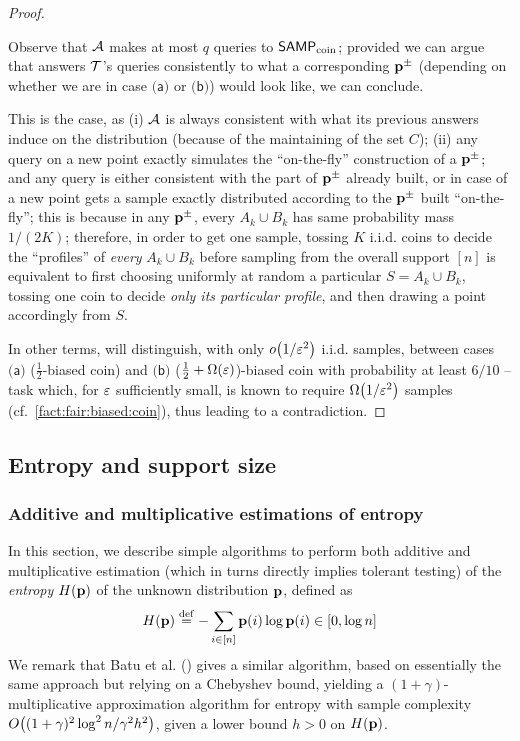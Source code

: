\begin{proof}
\begin{itemize}
\begin{itemize}
    \end{itemize}
  \end{itemize}
  Observe that $\mathcal{A}$ makes at most $q$ queries to ${\sf SAMP}_\text{coin}$; provided we can argue that \Algo answers $\mathcal{T}$'s queries consistently to what a corresponding $\mathbf{p}^\pm$ (depending on whether we are in case $\textsf{(a)}$ or $\textsf{(b)}$) would look like, we can conclude.
  
  \noindent This is the case, as \textsf{(i)} $\mathcal{A}$ is always consistent with what its previous answers induce on the distribution (because of the maintaining of the set $C$); \textsf{(ii)} any \EVAL query on a new point exactly simulates the ``on-the-fly'' construction of a $\mathbf{p}^\pm$; and any \SAMP query is either consistent with the part of $\mathbf{p}^\pm$ already built, or in case of a new point gets a sample exactly distributed according to the $\mathbf{p}^\pm$ built ``on-the-fly''; this is because in any $\mathbf{p}^\pm$, every $A_k\cup B_k$ has same probability mass $1/(2K)$; therefore, in order to get one sample, tossing $K$ i.i.d. coins to decide the ``profiles'' of \emph{every} $A_k\cup B_k$ before sampling from the overall support $[n]$ is equivalent to first choosing uniformly at random a particular $S=A_k\cup B_k$, tossing one coin to decide \emph{only its particular profile}, and then drawing a point accordingly from $S$.
  
  In other terms, \Algo will distinguish, with only $\littleO{1/\eps^2}$ i.i.d. samples, between cases $\textsf{(a)}$ ($\frac{1}{2}$-biased coin) and $\textsf{(b)}$ ($\frac{1}{2}+\bigOmega{\eps}$)-biased coin with probability at least $6/10$ -- task which, for $\varepsilon$ sufficiently small, is known to require $\bigOmega{1/\eps^2}$ samples (cf.~\cref{fact:fair:biased:coin}), thus leading to a contradiction.
\end{proof}

 \subsection{Entropy and support size}\label{sec:supportsize:entropy}
\subsubsection{Additive and multiplicative estimations of entropy}\label{sec:supportsize:entropy:support}

In this section, we describe simple algorithms to perform both additive and multiplicative estimation (which in turns directly implies tolerant testing) of the \emph{entropy} $H(\mathbf{p})$ of the unknown distribution $\mathbf{p}$, defined as 
\[
  H(\mathbf{p})\stackrel{\rm def}{=} -\sum_{i\in[n]} \mathbf{p}(i)\log\mathbf{p}(i) \in[0,\log n]
\]
We remark that Batu et al. (\cite[Theorem 14]{BDKR:05}) gives a similar algorithm, based on essentially the same approach but relying on a Chebyshev bound, yielding a $(1+\gamma)$-multiplicative approximation algorithm for entropy with sample complexity $\bigO{(1+\gamma)^2\log^2 n/\gamma^2h^2}$, given a lower bound $h>0$ on $H(\mathbf{p})$. 

